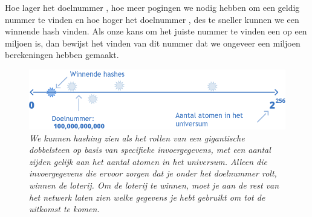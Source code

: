 Hoe lager het doelnummer , hoe meer pogingen we nodig hebben om een geldig nummer te vinden en hoe hoger het doelnummer , des te sneller kunnen we een winnende hash vinden. Als onze kans om het juiste nummer te vinden een op een miljoen is, dan bewijst het vinden van dit nummer dat we ongeveer een miljoen berekeningen hebben gemaakt.

\begin{figure}[h]
    \centering
    \includegraphics[width=\textwidth]{images/fig5.png}
    \caption{\footnotesize{\textit{We kunnen hashing zien als het rollen van een gigantische dobbelsteen op basis van specifieke invoergegevens, met een aantal zijden gelijk aan het aantal atomen in het universum. Alleen die invoergegevens die ervoor zorgen dat je onder het doelnummer rolt, winnen de loterij. Om de loterij te winnen, moet je aan de rest van het netwerk laten zien welke gegevens je hebt gebruikt om tot de uitkomst te komen.}}}
    \label{fig5}
\end{figure}
